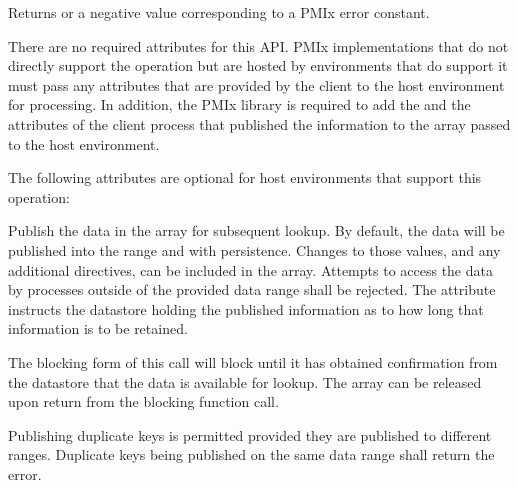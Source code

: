 \begin{arglist}
\end{arglist}

Returns  or a negative value corresponding to a PMIx error constant.

\reqattrstart
There are no required attributes for this \ac{API}. \ac{PMIx} implementations that do not directly support the operation but are hosted by environments that do support it must pass any attributes that are provided by the client to the host environment for processing. In addition, the \ac{PMIx} library is required to add the  and the  attributes of the client process that published the information to the  array passed to the host environment.

\reqattrend

\optattrstart
The following attributes are optional for host environments that support this operation:


\optattrend

\descr

Publish the data in the  array for subsequent lookup.
By default, the data will be published into the  range and with  persistence.
Changes to those values, and any additional directives, can be included in the  array. Attempts to access the data by processes outside of the provided data range shall be rejected. The  attribute instructs the datastore holding the published information as to how long that information is to be retained.

The blocking form of this call will block until it has obtained confirmation from the datastore that the data is available for lookup. The  array can be released upon return from the blocking function call.

Publishing duplicate keys is permitted provided they are published to different
ranges. Duplicate keys being published on the same data range shall return the
 error.


